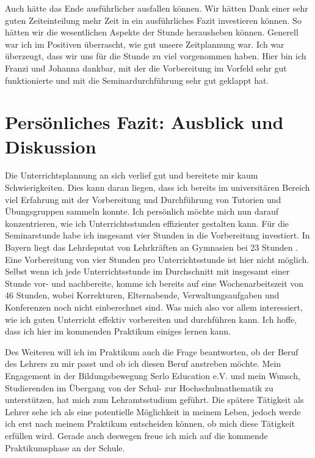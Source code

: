 \documentclass[man,12pt,a4paper]{apa6}
\begin{document}
Auch hätte das Ende ausführlicher ausfallen können. Wir hätten Dank einer sehr guten Zeiteinteilung mehr Zeit in ein ausführliches Fazit investieren können. So hätten wir die wesentlichen Aspekte der Stunde herausheben können. Generell war ich im Positiven überrascht, wie gut unsere Zeitplannung war. Ich war überzeugt, dass wir uns für die Stunde zu viel vorgenommen haben. Hier bin ich Franzi und Johanna dankbar, mit der die Vorbereitung im Vorfeld sehr gut funktionierte und mit die Seminardurchführung sehr gut geklappt hat.

\section{Persönliches Fazit: Ausblick und Diskussion}

Die Unterrichtsplannung an sich verlief gut und bereitete mir kaum Schwierigkeiten. Dies kann daran liegen, dass ich bereits im universitären Bereich viel Erfahrung mit der Vorbereitung und Durchführung von Tutorien und Übungsgruppen sammeln konnte. Ich persönlich möchte mich nun darauf konzentrieren, wie ich Unterrichtsstunden effizienter gestalten kann. Für die Seminarstunde habe ich insgesamt vier Stunden in die Vorbereitung investiert. In Bayern liegt das Lehrdeputat von Lehrkräften an Gymnasien bei 23 Stunden \parencite{kmstunden}. Eine Vorbereitung von vier Stunden pro Unterrichtsstunde ist hier nicht möglich. Selbst wenn ich jede Unterrichtsstunde im Durchschnitt mit insgesamt einer Stunde vor- und nachbereite, komme ich bereits auf eine Wochenarbeitszeit von 46 Stunden, wobei Korrekturen, Elternabende, Verwaltungsaufgaben und Konferenzen noch nicht einberechnet sind. Was mich also vor allem interessiert, wie ich guten Unterricht effektiv vorbereiten und durchführen kann. Ich hoffe, dass ich hier im kommenden Praktikum einiges lernen kann.

Des Weiteren will ich im Praktikum auch die Frage beantworten, ob der Beruf des Lehrers zu mir passt und ob ich diesen Beruf anstreben möchte. Mein Engagement in der Bildungsbewegung Serlo Education e.V. und mein Wunsch, Studierenden im Übergang von der Schul- zur Hochschulmathematik zu unterstützen, hat mich zum Lehramtsstudium geführt. Die spätere Tätigkeit als Lehrer sehe ich als eine potentielle Möglichkeit in meinem Leben, jedoch werde ich erst nach meinem Praktikum entscheiden können, ob mich diese Tätigkeit erfüllen wird. Gerade auch deswegen freue ich mich auf die kommende Praktikumsphase an der Schule.

\printbibliography
\end{document}
